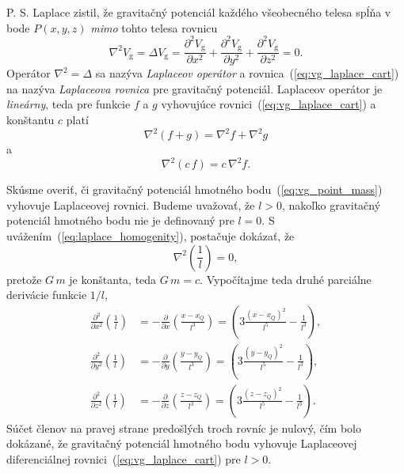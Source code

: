 \documentclass[a4paper, 12pt]{book}
\newcommand{\gidx}{\mathrm g}
\begin{document}
P. S. Laplace zistil, že gravitačný potenciál každého všeobecného telesa spĺňa 
v bode $P(x, y, z)$ \emph{mimo} tohto telesa rovnicu
%
\begin{equation}
\label{eq:vg_laplace_cart}
\nabla^2 V_\gidx = \Delta V_\gidx = \frac{\partial^2 V_\gidx}{\partial x^2}
+ \frac{\partial^2 V_\gidx}{\partial y^2} + \frac{\partial^2 V_\gidx}{\partial 
z^2} = 0{.}
\end{equation}
%
Operátor $\nabla^2 = \Delta$ sa nazýva \emph{Laplaceov operátor} 
a rovnica~(\ref{eq:vg_laplace_cart}) na nazýva \emph{Laplaceova rovnica} pre 
gravitačný potenciál.  Laplaceov operátor je \emph{lineárny}, teda pre funkcie 
$f$ a $g$ vyhovujúce rovnici~(\ref{eq:vg_laplace_cart}) a konštantu $c$ platí
%
\begin{equation}
\label{eq:laplace_additivity}
\nabla^2 \left(f + g \right) = \nabla^2 f + \nabla^2 g
\end{equation}
%
a
%
\begin{equation}
\label{eq:laplace_homogenity}
\nabla^2 (c \, f) = c \, \nabla^2 f{.}
\end{equation}

Skúsme overiť, či gravitačný potenciál hmotného bodu~(\ref{eq:vg_point_mass}) 
vyhovuje Laplaceovej rovnici.  Budeme uvažovať, že $l > 0$, nakoľko gravitačný 
potenciál hmotného bodu nie je definovaný pre $l = 0$.  
S uvážením~(\ref{eq:laplace_homogenity}), postačuje dokázať, že
%
\begin{equation}
\label{eq:nabla_l}
\nabla^2 \left( \frac{1}{l} \right) = 0{,}
\end{equation}
%
pretože $G \, m$ je konštanta, teda $G \, m = c$.  Vypočítajme teda druhé 
parciálne derivácie funkcie $1 \slash l$,
%
\begin{equation}
\label{eq:l_2nd_derivatives}
\begin{split}
\frac{\partial^2}{\partial x^2} \left( \frac{1}{l} \right) &= 
-\frac{\partial}{\partial x} \left( \frac{x - x_Q}{l^3} \right) = \left(3 
\frac{(x - x_Q)^2}{l^5} - \frac{1}{l^3} \right){,}\\
%
\frac{\partial^2}{\partial y^2} \left( \frac{1}{l} \right) &= 
-\frac{\partial}{\partial y} \left( \frac{y - y_Q}{l^3} \right) = \left(3 
\frac{(y - y_Q)^2}{l^5} - \frac{1}{l^3} \right){,}\\
%
\frac{\partial^2}{\partial z^2} \left( \frac{1}{l} \right) &= 
-\frac{\partial}{\partial z} \left( \frac{z - z_Q}{l^3} \right) = \left(3 
\frac{(z - z_Q)^2}{l^5} - \frac{1}{l^3} \right){.}
\end{split}
\end{equation}
%
Súčet členov na pravej strane predošlých troch rovníc je nulový, čím bolo 
dokázané, že gravitačný potenciál hmotného bodu vyhovuje Laplaceovej 
diferenciálnej rovnici~(\ref{eq:vg_laplace_cart}) pre $l > 0$.
\end{document}
